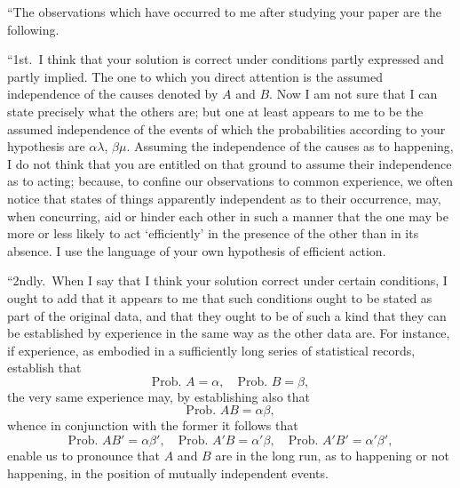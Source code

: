 \documentclass[11pt,a4paper]{article}
\theoremstyle{plain}
\begin{document}
``The observations which have occurred to me after studying your paper are the following.

\medskip

``1st.\ I think that your solution is correct under conditions partly expressed and partly implied. The one to which you direct attention is the assumed independence of the causes denoted by $A$ and $B$. Now I am not sure that I can state precisely what the others are; but one at least appears to me to be the assumed independence of the events of which the probabilities according to your hypothesis are $\alpha\lambda$, $\beta\mu$. Assuming the independence of the causes as to happening, I do not think that you are entitled on that ground to assume their independence as to acting; because, to confine our observations to common experience, we often notice that states of things apparently independent as to their occurrence, may, when concurring, aid or hinder each other in such a manner that the one may be more or less likely to act `efficiently' in the presence of the other than in its absence. I use the language of your own hypothesis of efficient action.

``2ndly.\ When I say that I think your solution correct under certain conditions, I ought to add that it appears to me that such conditions ought to be stated as part of the original data, and that they ought to be of such a kind that they can be established by experience in the same way as the other data are. For instance, if experience, as embodied in a sufficiently long series of statistical records, establish that
\[
\text{Prob.\ } A = \alpha, \quad \text{Prob.\ } B = \beta,
\]
the very same experience may, by establishing also that
\[
\text{Prob.\ } AB = \alpha\beta,
\]
whence in conjunction with the former it follows that
\[
\text{Prob.\ } AB' = \alpha\beta', \quad \text{Prob.\ } A'B = \alpha'\beta, \quad \text{Prob.\ } A'B' = \alpha'\beta',
\]
enable us to pronounce that $A$ and $B$ are in the long run, as to happening or not happening, in the position of mutually independent events.
\end{document}
